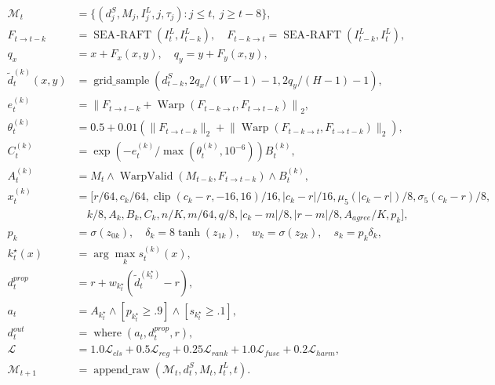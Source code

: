 \begin{align}
\mathcal M_t&=\{(d_j^S,M_j,I_j^L,j,\tau_j):j\le t,\ j\ge t-8\},\\
F_{t\to t-k}&=\operatorname{SEA\!\text{-}RAFT}(I_t^L,I_{t-k}^L),\quad
F_{t-k\to t}=\operatorname{SEA\!\text{-}RAFT}(I_{t-k}^L,I_t^L),\\
q_x&=x+F_x(x,y),\quad q_y=y+F_y(x,y),\\
\widetilde d_t^{(k)}(x,y)&=\operatorname{grid\_sample}(d_{t-k}^S,2q_x/(W-1)-1,2q_y/(H-1)-1),\\
e_t^{(k)}&=\left\|F_{t\to t-k}+\operatorname{Warp}(F_{t-k\to t},F_{t\to t-k})\right\|_2,\\
\theta_t^{(k)}&=0.5+0.01\left(\lVert F_{t\to t-k}\rVert_2+\lVert\operatorname{Warp}(F_{t-k\to t},F_{t\to t-k})\rVert_2\right),\\
C_t^{(k)}&=\exp(-e_t^{(k)}/\max(\theta_t^{(k)},10^{-6}))B_t^{(k)},\\
A_t^{(k)}&=M_t\land\operatorname{WarpValid}(M_{t-k},F_{t\to t-k})\land B_t^{(k)},\\
x_t^{(k)}&=[r/64,c_k/64,\operatorname{clip}(c_k-r,-16,16)/16,|c_k-r|/16,\mu_5(|c_k-r|)/8,\sigma_5(c_k-r)/8,\\
&\quad k/8,A_k,B_k,C_k,n/K,m/64,q/8,|c_k-m|/8,|r-m|/8,A_{agree}/K,p_k],\\
p_k&=\sigma(z_{0k}),\quad \delta_k=8\tanh(z_{1k}),\quad w_k=\sigma(z_{2k}),\quad s_k=p_k\delta_k,\\
k_t^\star(x)&=\arg\max_k s_t^{(k)}(x),\\
d_t^{prop}&=r+w_{k_t^\star}(\widetilde d_t^{(k_t^\star)}-r),\\
a_t&=A_{k_t^\star}\land[p_{k_t^\star}\ge .9]\land[s_{k_t^\star}\ge .1],\\
d_t^{out}&=\operatorname{where}(a_t,d_t^{prop},r),\\
\mathcal L&=1.0\mathcal L_{cls}+0.5\mathcal L_{reg}+0.25\mathcal L_{rank}+1.0\mathcal L_{fuse}+0.2\mathcal L_{harm},\\
\mathcal M_{t+1}&=\operatorname{append\_raw}(\mathcal M_t,d_t^S,M_t,I_t^L,t).
\end{align}

